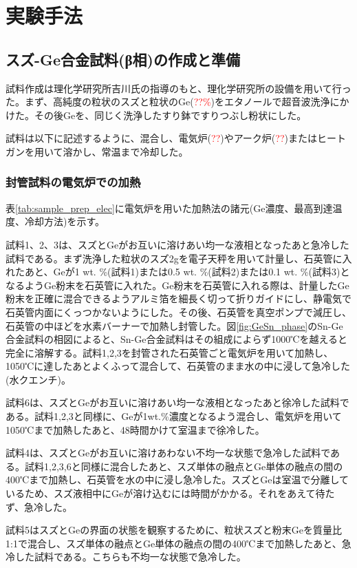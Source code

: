 \section{実験手法}
\subsection{スズ-Ge合金試料(β相)の作成と準備}
試料作成は理化学研究所吉川氏の指導のもと、理化学研究所の設備を用いて行った。まず、高純度の粒状のスズと粒状のGe(\textcolor{red}{??\%})をエタノールで超音波洗浄にかけた。その後Geを、同じく洗浄したすり鉢ですりつぶし粉状にした。

試料は以下に記述するように、混合し、電気炉(\textcolor{red}{??})やアーク炉(\textcolor{red}{??})またはヒートガンを用いて溶かし、常温まで冷却した。

\subsubsection{封管試料の電気炉での加熱}
表\ref{tab:sample_prep_elec}に電気炉を用いた加熱法の諸元(Ge濃度、最高到達温度、冷却方法)を示す。

試料1、2、3は、スズとGeがお互いに溶けあい均一な液相となったあと急冷した試料である。まず洗浄した粒状のスズ2gを電子天秤を用いて計量し、石英管に入れたあと、Geが1 wt. \%(試料1)または0.5 wt. \%(試料2)または0.1 wt. \%(試料3)となるようGe粉末を石英管に入れた。Ge粉末を石英管に入れる際は、計量したGe粉末を正確に混合できるようアルミ箔を細長く切って折りガイドにし、静電気で石英管内面にくっつかないようにした。その後、石英管を真空ポンプで減圧し、石英管の中ほどを水素バーナーで加熱し封管した。図\ref{fig:GeSn_phase}のSn-Ge合金試料の相図によると、Sn-Ge合金試料はその組成によらず1000℃を越えると完全に溶解する。試料1,2,3を封管された石英管ごと電気炉を用いて加熱し、1050℃に達したあとよくふって混合して、石英管のまま水の中に浸して急冷した(水クエンチ)。

試料6は、スズとGeがお互いに溶けあい均一な液相となったあと徐冷した試料である。試料1,2,3と同様に、Geが1wt.\%濃度となるよう混合し、電気炉を用いて1050℃まで加熱したあと、48時間かけて室温まで徐冷した。

試料4は、スズとGeがお互いに溶けあわない不均一な状態で急冷した試料である。試料1,2,3,6と同様に混合したあと、スズ単体の融点とGe単体の融点の間の400℃まで加熱し、石英管を水の中に浸し急冷した。スズとGeは室温で分離しているため、スズ液相中にGeが溶け込むには時間がかかる。それをあえて待たず、急冷した。

試料5はスズとGeの界面の状態を観察するために、粒状スズと粉末Geを質量比1:1で混合し、スズ単体の融点とGe単体の融点の間の400℃まで加熱したあと、急冷した試料である。こちらも不均一な状態で急冷した。

